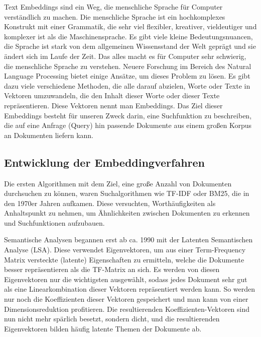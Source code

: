 Text Embeddings sind ein Weg, die menschliche Sprache für Computer verständlich zu machen.
Die menschliche Sprache ist ein hochkomplexes Konstrukt mit einer Grammatik, die sehr viel flexibler, kreativer, vieldeutiger und komplexer ist als die Maschinensprache.
Es gibt viele kleine Bedeutungsnuancen, die Sprache ist stark von dem allgemeinen Wissensstand der Welt geprägt und sie ändert sich im Laufe der Zeit.
Das alles macht es für Computer sehr schwierig, die menschliche Sprache zu verstehen.
Neuere Forschung im Bereich des Natural Language Processing bietet einige Ansätze, um dieses Problem zu lösen.
Es gibt dazu viele verschiedene Methoden, die alle darauf abzielen, Worte oder Texte in Vektoren umzuwandeln, die den Inhalt dieser Worte oder dieser Texte repräsentieren.
Diese Vektoren nennt man Embeddings.
Das Ziel dieser Embeddings besteht für unseren Zweck darin, eine Suchfunktion zu beschreiben, die auf eine Anfrage (Query) hin passende Dokumente aus einem großen Korpus an Dokumenten liefern kann.

\subsection{Entwicklung der Embeddingverfahren}

Die ersten Algorithmen mit dem Ziel, eine große Anzahl von Dokumenten durchsuchen zu können, waren Suchalgorithmen wie TF-IDF oder BM25, die in den 1970er Jahren aufkamen.
Diese versuchten, Worthäufigkeiten als Anhaltspunkt zu nehmen, um Ähnlichkeiten zwischen Dokumenten zu erkennen und Suchfunktionen aufzubauen.

Semantische Analysen begannen erst ab ca. 1990 mit der Latenten Semantischen Analyse (LSA).
Diese verwendet Eigenvektoren, um aus einer Term-Frequency Matrix versteckte (latente) Eigenschaften zu ermitteln, welche die Dokumente besser repräsentieren als die TF-Matrix an sich.
Es werden von diesen Eigenvektoren nur die wichtigsten ausgewählt, sodass jedes Dokument sehr gut als eine Linearkombination dieser Vektoren repräsentiert werden kann.
So werden nur noch die Koeffizienten dieser Vektoren gespeichert und man kann von einer Dimensionsreduktion profitieren.
Die resultierenden Koeffizienten-Vektoren sind nun nicht mehr spärlich besetzt, sondern dicht, und die resultierenden Eigenvektoren bilden häufig latente Themen der Dokumente ab.

